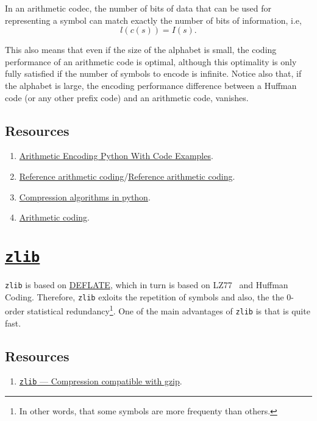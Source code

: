 In an arithmetic codec, the number of bits of data that can be used for
representing a symbol can match exactly the number of bits of
information, i.e,
\begin{equation}
  l(c(s)) = I(s).
\end{equation}

This also means that even if the size of the alphabet is small, the
coding performance of an arithmetic code is optimal, although this
optimality is only fully satisfied if the number of symbols to encode
is infinite. Notice also that, if the alphabet is large, the encoding
performance difference between a Huffman code (or any other prefix
code) and an arithmetic code, vanishes.

\subsection*{Resources}
\begin{enumerate}
\item
  \href{https://www.folkstalk.com/tech/arithmetic-encoding-python-with-code-examples/}{Arithmetic
    Encoding Python With Code Examples}.
\item \href{https://www.nayuki.io/page/reference-arithmetic-coding}{Reference arithmetic coding}/\href{https://github.com/nayuki/Reference-arithmetic-coding}{Reference arithmetic coding}.
\item \href{https://www.inference.org.uk/mackay/python/compress/#AC}{Compression algorithms in python}.
\item \href{https://github.com/vicente-gonzalez-ruiz/arithmetic_coding}{Arithmetic coding}.
\end{enumerate}

\section{\href{https://zlib.net/}{\texttt{zlib}}}

\texttt{zlib} is based on
\href{https://en.wikipedia.org/wiki/Deflate}{DEFLATE}, which in turn
is based on LZ77~\cite{vruiz__LZW} and Huffman Coding. Therefore,
\texttt{zlib} exloits the repetition of symbols and also, the the
0-order statistical redundancy\footnote{In other words, that some
  symbols are more frequenty than others.}. One of the main advantages
of \texttt{zlib} is that is quite fast.

\subsection*{Resources}
\begin{enumerate}
\item \href{https://docs.python.org/3/library/zlib.html}{\texttt{zlib}
    — Compression compatible with gzip}.
\end{enumerate}

